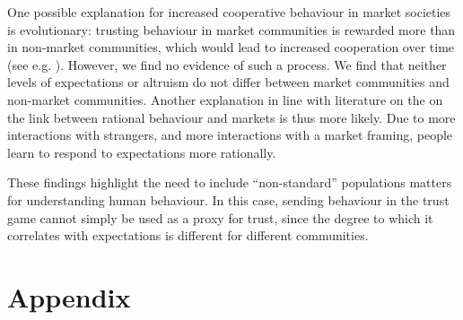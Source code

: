 One possible explanation for increased cooperative behaviour in market societies is evolutionary: trusting behaviour in market communities is rewarded more than in non-market communities, which would lead to increased cooperation  over time (see e.g. \citep{Tabellini2008}). However, we find no evidence of such a process. We find that neither levels of expectations or altruism do not differ between market communities and non-market communities. Another explanation in line with literature on the on the link between rational behaviour and markets \citep[e.g.][]{List2008,Cecchi2013} is thus more likely. Due to more interactions with strangers, and more interactions with a market framing, people learn to respond to expectations more rationally.

These findings highlight the need to include ``non-standard'' populations matters for understanding human behaviour. In this case, sending behaviour in the trust game cannot simply be used as a proxy for trust, since the degree to which it correlates with expectations is different for different communities.


\clearpage 




\clearpage
\section{Appendix}
\setcounter{table}{0}
\renewcommand{\thetable}{A\arabic{table}}





